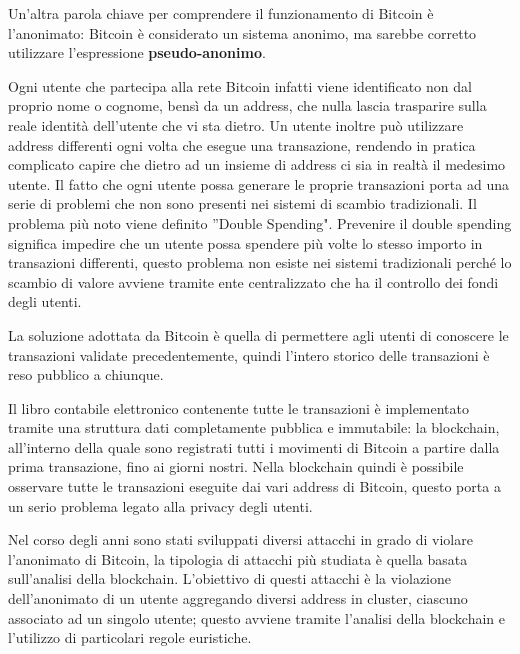 Un’altra parola chiave per comprendere il funzionamento di Bitcoin è l’anonimato: Bitcoin è considerato un sistema anonimo, ma sarebbe corretto utilizzare l’espressione \textbf{pseudo-anonimo}.

Ogni utente che partecipa alla rete Bitcoin infatti viene identificato non dal proprio nome o cognome, bensì da un address, che nulla lascia trasparire sulla reale identità dell'utente che vi sta dietro. Un utente inoltre può utilizzare address differenti ogni volta che esegue
una transazione, rendendo in pratica complicato capire che dietro ad un insieme di address ci sia in realtà il medesimo utente. Il fatto che ogni utente possa generare le proprie transazioni porta ad una serie di problemi che non sono presenti nei sistemi di scambio tradizionali. Il problema più noto viene definito ''Double Spending". Prevenire il double spending significa impedire che un utente possa spendere più volte lo stesso importo in transazioni differenti, questo problema non esiste nei sistemi tradizionali perché lo scambio di valore avviene tramite ente centralizzato che ha il controllo dei fondi degli utenti. 

La soluzione adottata da Bitcoin è quella di permettere agli utenti di conoscere le transazioni validate precedentemente, quindi l'intero storico delle transazioni è reso pubblico a chiunque.

Il libro contabile elettronico contenente tutte le transazioni è implementato tramite una struttura dati completamente pubblica e immutabile: la blockchain, all’interno della quale sono registrati tutti i movimenti di Bitcoin a partire dalla prima transazione, fino ai giorni nostri. Nella blockchain quindi è possibile osservare tutte le transazioni eseguite dai vari address di Bitcoin, questo porta a un serio problema legato alla privacy degli utenti. 

Nel corso degli anni sono stati sviluppati diversi attacchi in grado di violare l'anonimato di Bitcoin, la tipologia di attacchi più studiata è quella basata sull'analisi della blockchain. L'obiettivo di questi attacchi è la violazione dell'anonimato di un utente aggregando diversi address in cluster, ciascuno associato ad un singolo utente; questo avviene tramite l'analisi della blockchain e l'utilizzo di particolari regole euristiche.

